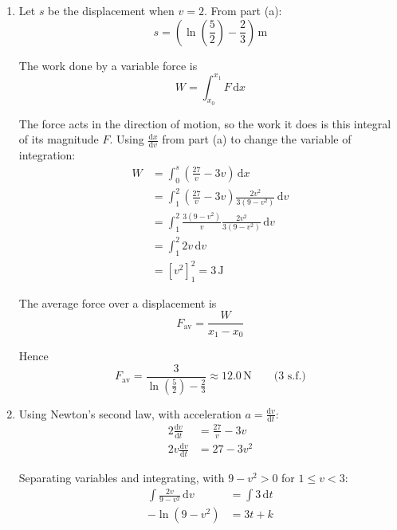 \documentclass[leqno]{article}
\begin{document}
\begin{enumerate}[
  label=\textbf{\arabic*.},
  leftmargin=*,
  topsep=0pt,
  partopsep=0pt,
  parsep=0pt
]
\begin{djsSolution}
\begin{enumerate}[label=\textbf{(\alph*)}, start=1]
At \(O\), \(x=0\) and \(v=1\), so
\begin{align*}
0&=-\frac23-\ln2+\ln4+c \\
c&=\frac23-\ln2
\end{align*}

The force is positive for \(1\leq v<3\), so the velocity increases towards \(3\). The logarithmic term tends to infinity as \(v\to3^{-}\), so \(v=3\) is not reached at any finite displacement. Substituting the constant and combining the logarithms gives
\[
x=\ln\left(\frac{3+v}{2(3-v)}\right)-\frac23(v-1),\qquad 1\leq v<3
\]

\item Let \(s\) be the displacement when \(v=2\). From part (a):
\[
s=\left(\ln\left(\frac{5}{2}\right)-\frac23\right)\,\mathrm{m}
\]

The work done by a variable force is
\[
W=\int_{x_0}^{x_1}F\,\mathrm{d}x
\]

The force acts in the direction of motion, so the work it does is this integral of its magnitude \(F\). Using \(\frac{\mathrm{d}x}{\mathrm{d}v}\) from part (a) to change the variable of integration:
\begin{align*}
W&=\int_0^s\left(\frac{27}{v}-3v\right)\,\mathrm{d}x \\
&=\int_1^2\left(\frac{27}{v}-3v\right)\frac{2v^2}{3(9-v^2)}\,\mathrm{d}v \\
&=\int_1^2\frac{3(9-v^2)}{v}\frac{2v^2}{3(9-v^2)}\,\mathrm{d}v \\
&=\int_1^2 2v\,\mathrm{d}v \\
&=\left[v^2\right]_1^2=3\,\mathrm{J}
\end{align*}

The average force over a displacement is
\[
F_{\mathrm{av}}=\dfrac{W}{x_1-x_0}
\]

Hence
\[
F_{\mathrm{av}}=\frac{3}{\ln\left(\frac52\right)-\frac23}\approx12.0\,\mathrm{N}\qquad\text{(3 s.f.)}
\]

\item Using Newton's second law, with acceleration \(a=\frac{\mathrm{d}v}{\mathrm{d}t}\):
\begin{align*}
2\frac{\mathrm{d}v}{\mathrm{d}t}&=\frac{27}{v}-3v \\
2v\frac{\mathrm{d}v}{\mathrm{d}t}&=27-3v^2
\end{align*}

Separating variables and integrating, with \(9-v^2>0\) for \(1\leq v<3\):
\begin{align*}
\int\frac{2v}{9-v^2}\,\mathrm{d}v&=\int3\,\mathrm{d}t \\
-\ln(9-v^2)&=3t+k
\end{align*}


\end{enumerate}
\end{djsSolution}
\end{enumerate}
\end{document}
